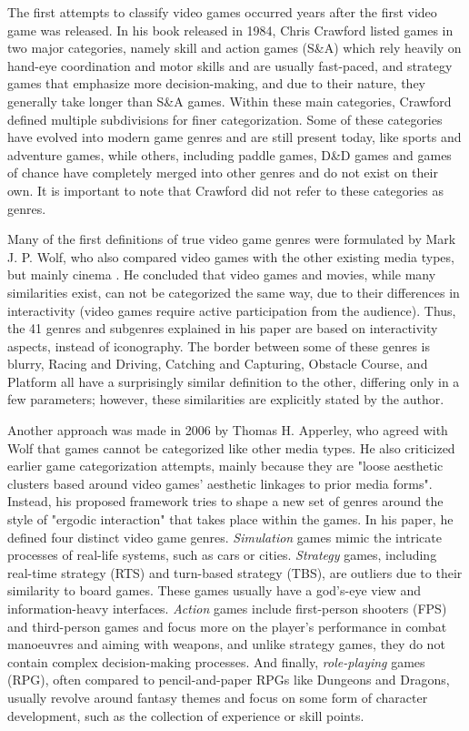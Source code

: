 The first attempts to classify video games occurred years after the first video game was released. In his book released in 1984, Chris Crawford listed games in two major categories, namely skill and action games (S\&A) which rely heavily on hand-eye coordination and motor skills and are usually fast-paced, and strategy games that emphasize more decision-making, and due to their nature, they generally take longer than S\&A games\cite{crawford1984art}. Within these main categories, Crawford defined multiple subdivisions for finer categorization. Some of these categories have evolved into modern game genres and are still present today, like sports and adventure games, while others, including paddle games, D\&D games and games of chance have completely merged into other genres and do not exist on their own. It is important to note that Crawford did not refer to these categories as genres.

Many of the first definitions of true video game genres were formulated by Mark J. P. Wolf, who also compared video games with the other existing media types, but mainly cinema \cite{wolf2002genre}. He concluded that video games and movies, while many similarities exist, can not be categorized the same way, due to their differences in interactivity (video games require active participation from the audience). Thus, the 41 genres and subgenres explained in his paper\cite{wolf2002genre} are based on interactivity aspects, instead of iconography. The border between some of these genres is blurry, Racing and Driving, Catching and Capturing, Obstacle Course, and Platform all have a surprisingly similar definition to the other, differing only in a few parameters; however, these similarities are explicitly stated by the author.

Another approach was made in 2006 by Thomas H. Apperley, who agreed with Wolf that games cannot be categorized like other media types. He also criticized earlier game categorization attempts, mainly because they are "loose aesthetic clusters based around video games' aesthetic linkages to prior media forms"\cite{apperley2006genre}. Instead, his proposed framework tries to shape a new set of genres around the style of "ergodic interaction" that takes place within the games. In his paper, he defined four distinct video game genres. \textit{Simulation} games mimic the intricate processes of real-life systems, such as cars or cities. \textit{Strategy} games, including real-time strategy (RTS) and turn-based strategy (TBS), are outliers due to their similarity to board games. These games usually have a god's-eye view and information-heavy interfaces. \textit{Action} games include first-person shooters (FPS) and third-person games and focus more on the player's performance in combat manoeuvres and aiming with weapons, and unlike strategy games, they do not contain complex decision-making processes. And finally, \textit{role-playing} games (RPG), often compared to pencil-and-paper RPGs like Dungeons and Dragons, usually revolve around fantasy themes and focus on some form of character development, such as the collection of experience or skill points.


